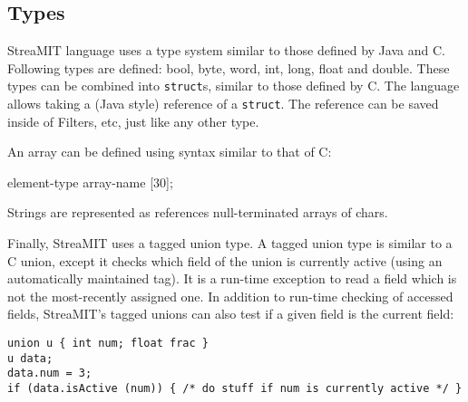 \subsection{Types}

StreaMIT language uses a type system similar to those defined by Java and
C.  Following types are defined: bool, byte, word, int, long, float 
and double.  These types can be combined into {\tt struct}s, similar 
to those defined by C.  The language allows taking a (Java style) 
reference of a {\tt struct}.  The reference can be saved inside of 
Filters, etc, just like any other type.

An array can be defined using syntax similar to that of C:

element-type array-name [30];

Strings are represented as references null-terminated arrays of chars.

Finally, StreaMIT uses a tagged union type.  A tagged union type is similar
to a C union, except it checks which field of the union is currently active
(using an automatically maintained tag).  It is a run-time exception to
read a field which is not the most-recently assigned one.  In addition
to run-time checking of accessed fields, StreaMIT's tagged unions can also
test if a given field is the current field:

\begin{verbatim}
union u { int num; float frac }
u data;
data.num = 3;
if (data.isActive (num)) { /* do stuff if num is currently active */ }
\end{verbatim}


